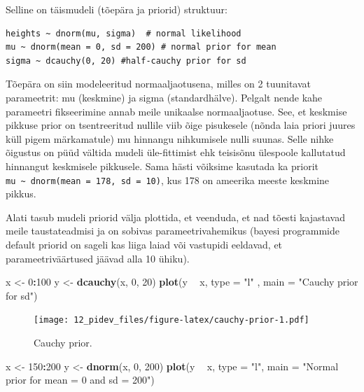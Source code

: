 \documentclass[]{book}
\newenvironment{Shaded}{\begin{snugshade}}{\end{snugshade}}
\newcommand{\DataTypeTok}[1]{\textcolor[rgb]{0.13,0.29,0.53}{#1}}
\newcommand{\DecValTok}[1]{\textcolor[rgb]{0.00,0.00,0.81}{#1}}
\newcommand{\KeywordTok}[1]{\textcolor[rgb]{0.13,0.29,0.53}{\textbf{#1}}}
\newcommand{\NormalTok}[1]{#1}
\newcommand{\OperatorTok}[1]{\textcolor[rgb]{0.81,0.36,0.00}{\textbf{#1}}}
\newcommand{\StringTok}[1]{\textcolor[rgb]{0.31,0.60,0.02}{#1}}
\begin{document}
Selline on täismudeli (tõepära ja priorid) struktuur:

\begin{verbatim}
heights ~ dnorm(mu, sigma)  # normal likelihood
mu ~ dnorm(mean = 0, sd = 200) # normal prior for mean
sigma ~ dcauchy(0, 20) #half-cauchy prior for sd 
\end{verbatim}

Tõepära on siin modeleeritud normaaljaotusena, milles on 2 tuunitavat parameetrit: mu (keskmine) ja sigma (standardhälve).
Pelgalt nende kahe parameetri fikseerimine annab meile unikaalse normaaljaotuse.
See, et keskmise pikkuse prior on tsentreeritud nullile viib õige pisukesele (nõnda laia priori juures küll pigem märkamatule) mu hinnangu nihkumisele nulli suunas.
Selle nihke õigustus on püüd vältida mudeli üle-fittimist ehk teisisõnu ülespoole kallutatud hinnangut keskmisele pikkusele.
Sama hästi võiksime kasutada ka priorit \texttt{mu\ \textasciitilde{}\ dnorm(mean\ =\ 178,\ sd\ =\ 10)}, kus 178 on ameerika meeste keskmine pikkus.

Alati tasub mudeli priorid välja plottida, et veenduda, et nad tõesti kajastavad meile taustateadmisi ja on sobivas parameetrivahemikus (bayesi programmide default priorid on sageli kas liiga laiad või vastupidi eeldavad, et parameetriväärtused jäävad alla 10 ühiku).



\begin{Shaded}
\begin{Highlighting}[]
\NormalTok{x <-}\StringTok{ }\DecValTok{0}\OperatorTok{:}\DecValTok{100}
\NormalTok{y <-}\StringTok{ }\KeywordTok{dcauchy}\NormalTok{(x, }\DecValTok{0}\NormalTok{, }\DecValTok{20}\NormalTok{)}
\KeywordTok{plot}\NormalTok{(y }\OperatorTok{~}\StringTok{ }\NormalTok{x, }\DataTypeTok{type =} \StringTok{"l"}\NormalTok{ , }\DataTypeTok{main =} \StringTok{"Cauchy prior for sd"}\NormalTok{)}
\end{Highlighting}
\end{Shaded}

\begin{figure}
\centering
\texttt{[image: 12\_pidev\_files/figure-latex/cauchy-prior-1.pdf]}
\caption{\label{fig:cauchy-prior}Cauchy prior.}
\end{figure}



\begin{Shaded}
\begin{Highlighting}[]
\NormalTok{x <-}\StringTok{ }\DecValTok{150}\OperatorTok{:}\DecValTok{200}
\NormalTok{y <-}\StringTok{ }\KeywordTok{dnorm}\NormalTok{(x, }\DecValTok{0}\NormalTok{, }\DecValTok{200}\NormalTok{)}
\KeywordTok{plot}\NormalTok{(y }\OperatorTok{~}\StringTok{ }\NormalTok{x, }\DataTypeTok{type =} \StringTok{"l"}\NormalTok{, }\DataTypeTok{main =} \StringTok{"Normal prior for mean = 0 and sd = 200"}\NormalTok{)}
\end{Highlighting}
\end{Shaded}
\end{document}
